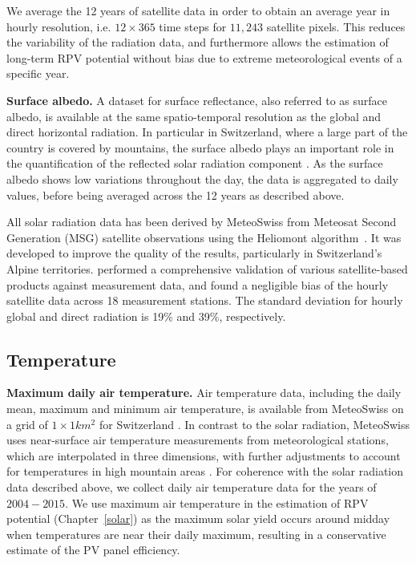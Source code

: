 We average the 12 years of satellite data in order to obtain an average year in hourly resolution, i.e. $12 \times 365$ time steps for $11,243$ satellite pixels. This reduces the variability of the radiation data, and furthermore allows the estimation of long-term RPV potential without bias due to extreme meteorological events of a specific year.

\textbf{Surface albedo.} A dataset for surface reflectance, also referred to as surface albedo, is available at the same spatio-temporal resolution as the global and direct horizontal radiation. In particular in Switzerland, where a large part of the country is covered by mountains, the surface albedo plays an important role in the quantification of the reflected solar radiation component \cite{kahl_bright_2019}. As the surface albedo shows low variations throughout the day, the data is aggregated to daily values, before being averaged across the 12 years as described above.

All solar radiation data has been derived by MeteoSwiss from Meteosat Second Generation (MSG) satellite observations using the Heliomont algorithm~\cite{stockli_heliomont_2017}. It was developed to improve the quality of the results, particularly in Switzerland's Alpine territories. 
\citet{ineichen_long_2014} performed a comprehensive validation of various satellite-based products against measurement data, and found a negligible bias of the hourly satellite data across 18 measurement stations. 
The standard deviation for hourly global and direct radiation is 19\% and 39\%, respectively.

\subsection{Temperature}

\textbf{Maximum daily air temperature.} Air temperature data, including the daily mean, maximum and minimum air temperature, is available from MeteoSwiss on a grid of $1 \times 1 km^2$ for Switzerland \cite{meteoswiss_daily_2017}. 
In contrast to the solar radiation, MeteoSwiss uses near-surface air temperature measurements from meteorological stations, which are interpolated in three dimensions, with further adjustments to account for temperatures in high mountain areas \cite{meteoswiss_daily_2017}.
For coherence with the solar radiation data described above, we collect daily air temperature data for the years of $2004-2015$. 
We use maximum air temperature in the estimation of RPV potential (Chapter~\ref{solar}) as the maximum solar yield occurs around midday when temperatures are near their daily maximum, resulting in a conservative estimate of the PV panel efficiency.

